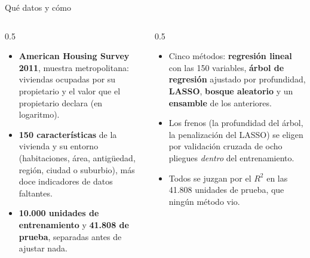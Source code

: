 \documentclass{beamer}
\begin{document}
\begin{frame}{Qué datos y cómo}
\footnotesize
\begin{columns}[T]
\begin{column}{0.5\textwidth}
\begin{itemize}\itemsep3pt
  \item \textbf{American Housing Survey 2011}, muestra metropolitana: viviendas ocupadas por su propietario y el valor que el propietario declara (en logaritmo).
  \item \textbf{150 características} de la vivienda y su entorno (habitaciones, área, antigüedad, región, ciudad o suburbio), más doce indicadores de datos faltantes.
  \item \textbf{10.000 unidades de entrenamiento} y \textbf{41.808 de prueba}, separadas antes de ajustar nada.
\end{itemize}
\end{column}
\begin{column}{0.5\textwidth}
\begin{itemize}\itemsep3pt
  \item Cinco métodos: \textbf{regresión lineal} con las 150 variables, \textbf{árbol de regresión} ajustado por profundidad, \textbf{LASSO}, \textbf{bosque aleatorio} y un \textbf{ensamble} de los anteriores.
  \item Los frenos (la profundidad del árbol, la penalización del LASSO) se eligen por validación cruzada de ocho pliegues \emph{dentro} del entrenamiento.
  \item Todos se juzgan por el $R^2$ en las 41.808 unidades de prueba, que ningún método vio.
\end{itemize}
\end{column}
\end{columns}
\smallskip
{}
\end{frame}
\end{document}
